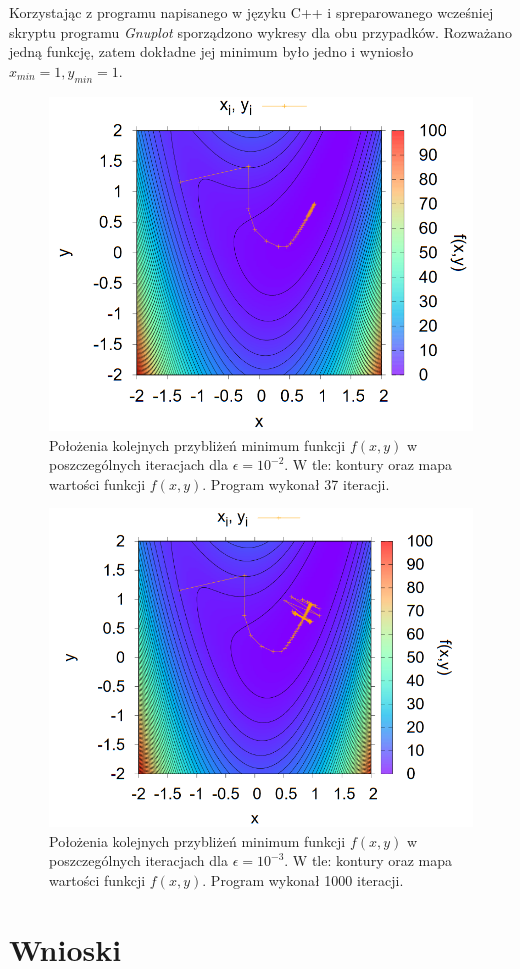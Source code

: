 Korzystając z programu napisanego w języku C++ i spreparowanego wcześniej skryptu programu \textit{Gnuplot} sporządzono wykresy dla obu przypadków. Rozważano jedną funkcję, zatem dokładne jej minimum było jedno i wyniosło $ x_{min} = 1, y_{min} = 1 $.
\begin{figure}[h!]
	\begin{center}
		\includegraphics[height=0.41\linewidth]{min1.png}
	\caption{Położenia kolejnych przybliżeń minimum funkcji $ f(x, y) $ w poszczególnych iteracjach dla $\epsilon = 10^{-2} $. W tle: kontury oraz mapa wartości funkcji $ f(x, y) $. Program wykonał 37 iteracji.}
	\label{pierwszy} 
	\end{center}
\end{figure}
\begin{figure}[h!]
	\begin{center}
	\includegraphics[height=0.41\linewidth]{min2.png}
	\caption{Położenia kolejnych przybliżeń minimum funkcji $ f(x, y) $ w poszczególnych iteracjach dla $\epsilon = 10^{-3} $. W tle: kontury oraz mapa wartości funkcji $ f(x, y) $. Program wykonał 1000 iteracji.}
	\label{drugi} 
\end{center}
\end{figure}

\newpage
\section{Wnioski}

